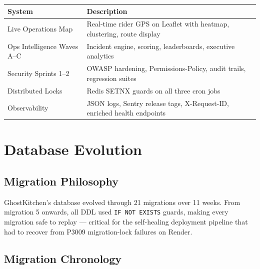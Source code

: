 \documentclass[11pt,a4paper,twoside]{book}
\newcommand{\th}[1]{\textbf{\color{white}#1}}
\begin{document}
\begin{center}\small
\begin{tabular}{p{3.5cm}p{9cm}}
\toprule
\rowcolor{headbg}\th{System} & \th{Description} \\
\midrule
Live Operations Map      & Real-time rider GPS on Leaflet with heatmap, clustering, route display \\
\rowcolor{rowalt}Ops Intelligence Waves A–C & Incident engine, scoring, leaderboards, executive analytics \\
Security Sprints 1–2     & OWASP hardening, Permissions-Policy, audit trails, regression suites \\
\rowcolor{rowalt}Distributed Locks         & Redis SETNX guards on all three cron jobs \\
Observability             & JSON logs, Sentry release tags, X-Request-ID, enriched health endpoints \\
\bottomrule
\end{tabular}
\end{center}

\chapter{Database Evolution}

\section{Migration Philosophy}

GhostKitchen's database evolved through 21 migrations over 11 weeks.  From
migration 5 onwards, all DDL used \texttt{IF NOT EXISTS} guards, making every
migration safe to replay — critical for the self-healing deployment pipeline
that had to recover from P3009 migration-lock failures on Render.

\section{Migration Chronology}
\end{document}
